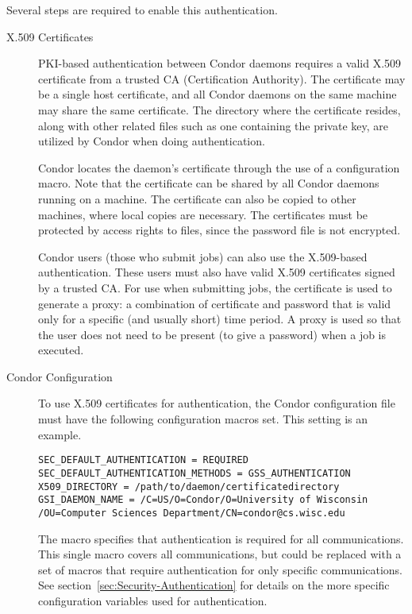 Several steps are required to enable this authentication.
\begin{description}
\item[X.509 Certificates]

PKI-based authentication between Condor daemons
requires
a valid X.509 certificate from a trusted
CA (Certification Authority).
The certificate may be a single host certificate,
and all Condor daemons on the same machine may share the same certificate.
The directory where the certificate resides, along with
other related files such as one containing the private key,
are utilized by Condor when doing authentication. 

Condor locates the daemon's certificate through the use of
a configuration macro.
Note that the certificate can be shared by all Condor daemons
running on a machine.
The certificate can also be copied to other machines,
where local copies are necessary.
The certificates must be protected by access rights to
files, since the password file is not encrypted.

Condor users (those who submit jobs) can also use
the X.509-based authentication.
These users must also
have valid X.509 certificates signed by a trusted CA.
For use when submitting jobs,
the certificate is used to generate a proxy:
a combination of certificate and password that is valid only
for a specific (and usually short) time period.
A proxy is used so that the user does  
not need to be present (to give a password) when a job is executed.

\item[Condor Configuration]

To use X.509 certificates for authentication, the Condor configuration file
must have the following configuration macros set.
This setting is an example.

\footnotesize
\begin{verbatim}
SEC_DEFAULT_AUTHENTICATION = REQUIRED
SEC_DEFAULT_AUTHENTICATION_METHODS = GSS_AUTHENTICATION 
X509_DIRECTORY = /path/to/daemon/certificatedirectory
GSI_DAEMON_NAME = /C=US/O=Condor/O=University of Wisconsin
/OU=Computer Sciences Department/CN=condor@cs.wisc.edu
\end{verbatim}
\normalsize

The
 macro specifies that
authentication is required for all communications.
This single macro covers all communications, but could be
replaced with a set of macros that require authentication for
only specific communications.
See section~\ref{sec:Security-Authentication} for details on the
more specific configuration variables used for authentication.


\end{description}
